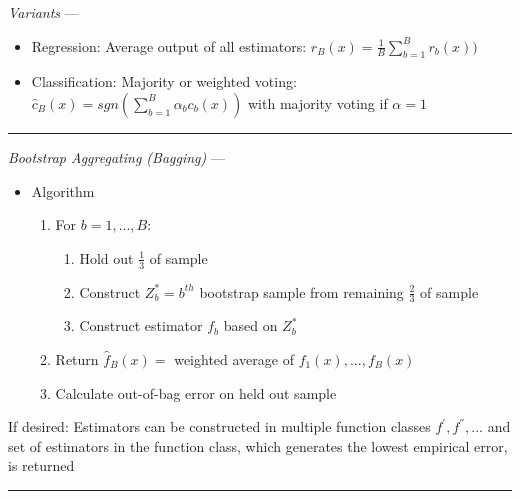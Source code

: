 \emph{Variants} --- 
\begin{itemize}
    \item Regression: Average output of all estimators: $\hat{r}_B(x) = \frac{1}{B} \sum_{b=1}^B r_b(x) )$ 
    \item Classification: Majority or weighted voting:
    $\hat{c}_B(x) = sgn( \sum_{b=1}^B \alpha_b c_b(x) )$ with majority voting if $\alpha = 1$
\end{itemize}

{\color{lightgray}\hrule height 0.001mm}

\emph{Bootstrap Aggregating (Bagging)} --- 
\begin{itemize}
    \item Algorithm
    \begin{enumerate}
        \item For $b = 1, ..., B$:
        \begin{enumerate}
            \item Hold out $\frac{1}{3}$ of sample
            \item Construct $Z^{*}_b = b^{th}$ bootstrap sample from remaining $\frac{2}{3}$ of sample
            \item Construct estimator $f_b$ based on $Z^{*}_b$ 
        \end{enumerate}
        \item Return $\hat{f}_B(x) =$ weighted average of $f_1(x), ..., f_B(x)$
        \item Calculate out-of-bag error on held out sample
    \end{enumerate}
\end{itemize}
If desired: Estimators can be constructed in multiple function classes $f^{'}, f^{''}, ...$ and set of estimators in the function class, which generates the lowest empirical error, is returned

{\color{lightgray}\hrule height 0.001mm}


